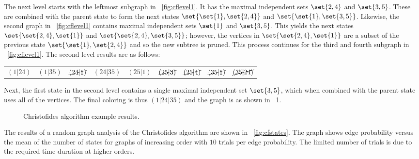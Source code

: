 The next level starts with the leftmost subgraph in \figurename~\ref{fig:cflevel1}.  It has the maximal independent
sets \(\set{2,4}\) and \(\set{3,5}\).  These are combined with the parent state to form the next states
\(\set{\set{1},\set{2,4}}\) and \(\set{\set{1},\set{3,5}}\).  Likewise, the second graph in
\figurename~\ref{fig:cflevel1} contains maximal independent sets \(\set{1}\) and \(\set{3,5}\).  This yields the
next states \(\set{\set{2,4},\set{1}}\) and \(\set{\set{2,4},\set{3,5}}\); however, the vertices in
\(\set{\set{2,4},\set{1}}\) are a subset of the previous state \(\set{\set{1},\set{2,4}}\) and so the new subtree
is pruned.  This process continues for the third and fourth subgraph in \figurename~\ref{fig:cflevel1}.  The second
level results are as follows:

\begin{tabular}{ccccccccc}
  \((1|24)\) & \((1|35)\) & \(\cancel{(24|1)}\) & \((24|35)\) & \((25|1)\) & \(\cancel{(25|3)}\) &
  \(\cancel{(25|4)}\) & \(\cancel{(35|1)}\) & \(\cancel{(35|24)}\)
\end{tabular}

Next, the first state in the second level contains a single maximal independent set \(\set{3,5}\), which when
combined with the parent state uses all of the vertices.  The final coloring is thus \((1|24|35)\) and the graph is
 as shown in \figurename~\ref{fig:cfresults}.

\begin{figure}[H]
  \centering
  \caption{Christofides algorithm example results.}
  \label{fig:cfresults}
\end{figure}

The results of a random graph analysis of the Christofides algorithm are shown in \figurename~\ref{fig:cfstates}.
The graph shows edge probability versus the mean of the number of states for graphs of increasing order with \(10\)
trials per edge probability.  The limited number of trials is due to the required time duration at higher orders.

